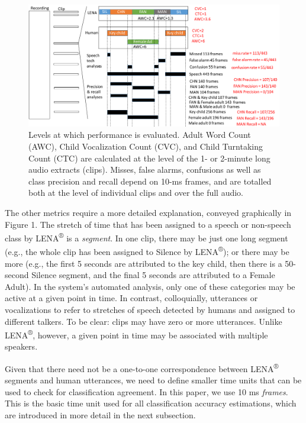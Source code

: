 \documentclass[english,floatsintext,man]{apa6}
\begin{document}
\begin{figure}
\centering
\includegraphics{fig_levels.pdf}
\caption{Levels at which performance is evaluated. Adult Word Count
(AWC), Child Vocalization Count (CVC), and Child Turntaking Count (CTC)
are calculated at the level of the 1- or 2-minute long audio extracts
(clips). Misses, false alarms, confusions as well as class precision and
recall depend on 10-ms frames, and are totalled both at the level of
individual clips and over the full audio.}
\end{figure}

The other metrics require a more detailed explanation, conveyed
graphically in Figure 1. The stretch of time that has been assigned to a
speech or non-speech class by LENA\textsuperscript{®} is a
\emph{segment}. In one clip, there may be just one long segment (e.g.,
the whole clip has been assigned to Silence by LENA\textsuperscript{®});
or there may be more (e.g., the first 5 seconds are attributed to the
key child, then there is a 50-second Silence segment, and the final 5
seconds are attributed to a Female Adult). In the system's automated
analysis, only one of these categories may be active at a given point in
time. In contrast, colloquially, utterances or vocalizations to refer to
stretches of speech detected by humans and assigned to different
talkers. To be clear: clips may have zero or more utterances. Unlike
LENA\textsuperscript{®}, however, a given point in time may be
associated with multiple speakers.

Given that there need not be a one-to-one correspondence between
LENA\textsuperscript{®} segments and human utterances, we need to define
smaller time units that can be used to check for classification
agreement. In this paper, we use 10 ms \emph{frames}. This is the basic
time unit used for all classification accuracy estimations, which are
introduced in more detail in the next subsection.
\end{document}
